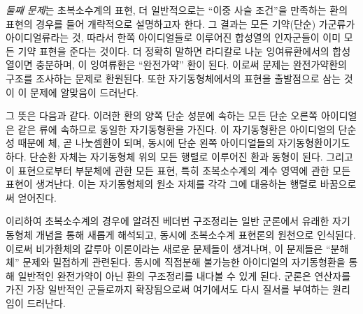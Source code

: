 \documentclass[11pt]{article}
\begin{document}
\emph{둘째 문제}는 초복소수계의 표현, 더 일반적으로는 ``이중 사슬 조건''을 만족하는 환의 표현의 경우를 들어 개략적으로 설명하고자 한다. 그 결과는 모든 기약(단순) 가군류가 아이디얼류라는 것, 따라서 한쪽 아이디얼들로 이루어진 합성열의 인자군들이 이미 모든 기약 표현을 준다는 것이다. 더 정확히 말하면 라디칼로 나눈 잉여류환에서의 합성열이면 충분하며, 이 잉여류환은 ``완전가약'' 환이 된다. 이로써 문제는 완전가약환의 구조를 조사하는 문제로 환원된다. 또한 자기동형체에서의 표현을 출발점으로 삼는 것이 이 문제에 알맞음이 드러난다.

그 뜻은 다음과 같다. 이러한 환의 양쪽 단순 성분에 속하는 모든 단순 오른쪽 아이디얼은 같은 류에 속하므로 동일한 자기동형환을 가진다. 이 자기동형환은 아이디얼의 단순성 때문에 체, 곧 나눗셈환이 되며, 동시에 단순 왼쪽 아이디얼들의 자기동형환이기도 하다. 단순환 자체는 자기동형체 위의 모든 행렬로 이루어진 환과 동형이 된다. 그리고 이 표현으로부터 부분체에 관한 모든 표현, 특히 초복소수계의 계수 영역에 관한 모든 표현이 생겨난다. 이는 자기동형체의 원소 자체를 각각 그에 대응하는 행렬로 바꿈으로써 얻어진다.

이리하여 초복소수계의 경우에 알려진 베더번 구조정리는 일반 군론에서 유래한 자기동형체 개념을 통해 새롭게 해석되고, 동시에 초복소수계 표현론의 원천으로 인식된다. 이로써 비가환체의 갈루아 이론이라는 새로운 문제들이 생겨나며, 이 문제들은 ``분해체'' 문제와 밀접하게 관련된다. 동시에 직접분해 불가능한 아이디얼의 자기동형환을 통해 일반적인 완전가약이 아닌 환의 구조정리를 내다볼 수 있게 된다. 군론은 연산자를 가진 가장 일반적인 군들로까지 확장됨으로써 여기에서도 다시 질서를 부여하는 원리임이 드러난다.
\end{document}

